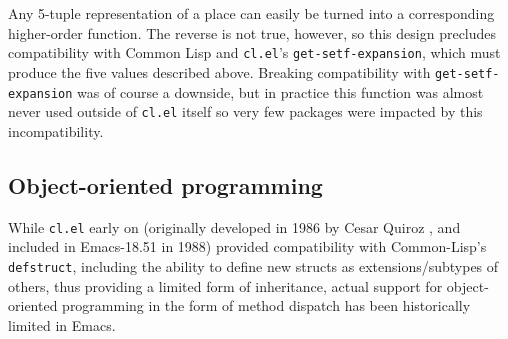 \documentclass[format=acmsmall, review=false, screen=true]{acmart}
\begin{document}
Any 5-tuple representation of a place can easily be turned into
a corresponding higher-order function.  The reverse is not true, however, so
this design precludes compatibility with Common Lisp and
\texttt{cl.el}'s \texttt{get-setf-expansion}, which must produce the
five values described above.
Breaking compatibility with \texttt{get-setf-expansion}
was of course
a downside, but in practice this function was almost never used outside of
\texttt{cl.el} itself so very few packages were impacted by
this incompatibility.


\subsection{Object-oriented programming} %

While \texttt{cl.el} early on (originally developed in 1986 by Cesar Quiroz
, and included in Emacs-18.51 in 1988)
provided compatibility with Common-Lisp's \texttt{defstruct}, including the
ability to define new structs as extensions/subtypes of others, thus
providing a limited form of inheritance, actual support for object-oriented
programming in the form of method dispatch has been historically limited
in Emacs.
\end{document}
